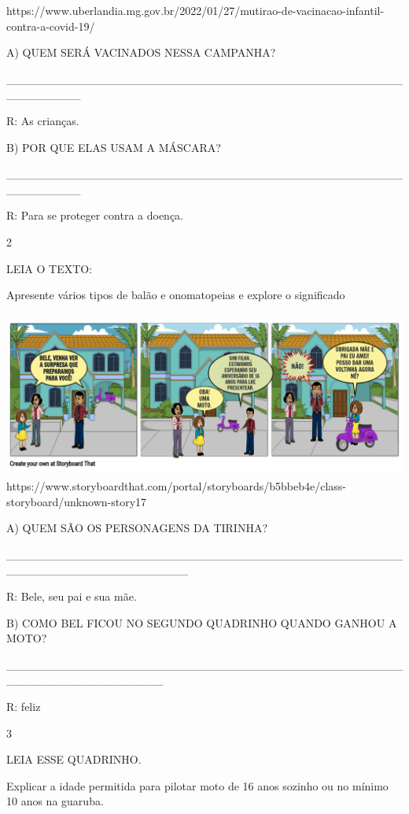 {{https://www.uberlandia.mg.gov.br/2022/01/27/mutirao-de-vacinacao-infantil-contra-a-covid-19/

A) QUEM SERÁ VACINADOS NESSA CAMPANHA?

\_\_\_\_\_\_\_\_\_\_\_\_\_\_\_\_\_\_\_\_\_\_\_\_\_\_\_\_\_\_\_\_\_\_\_\_\_\_\_\_\_\_\_\_\_\_\_\_\_\_\_\_\_\_\_\_\_

R: As crianças.

B) POR QUE ELAS USAM A MÁSCARA?

\_\_\_\_\_\_\_\_\_\_\_\_\_\_\_\_\_\_\_\_\_\_\_\_\_\_\_\_\_\_\_\_\_\_\_\_\_\_\_\_\_\_\_\_\_\_\_\_\_\_\_\_\_\_\_\_\_

R: Para se proteger contra a doença.

\num{2}

LEIA O TEXTO:

Apresente vários tipos de balão e onomatopeias e explore o significado

\includegraphics[width=5.56806in,height=2.13216in]{media/image129.png}https://www.storyboardthat.com/portal/storyboards/b5bbeb4e/class-storyboard/unknown-story17

A) QUEM SÃO OS PERSONAGENS DA TIRINHA?

\_\_\_\_\_\_\_\_\_\_\_\_\_\_\_\_\_\_\_\_\_\_\_\_\_\_\_\_\_\_\_\_\_\_\_\_\_\_\_\_\_\_\_\_\_\_\_\_\_\_\_\_\_\_\_\_\_\_\_\_\_\_\_\_\_\_\_\_\_\_

R: Bele, seu pai e sua mãe.

B) COMO BEL FICOU NO SEGUNDO QUADRINHO QUANDO GANHOU A MOTO?

\_\_\_\_\_\_\_\_\_\_\_\_\_\_\_\_\_\_\_\_\_\_\_\_\_\_\_\_\_\_\_\_\_\_\_\_\_\_\_\_\_\_\_\_\_\_\_\_\_\_\_\_\_\_\_\_\_\_\_\_\_\_\_\_\_\_\_

R: feliz

\num{3}

LEIA ESSE QUADRINHO.

Explicar a idade permitida para pilotar moto de 16 anos sozinho ou no
mínimo 10 anos na guaruba.

}}

